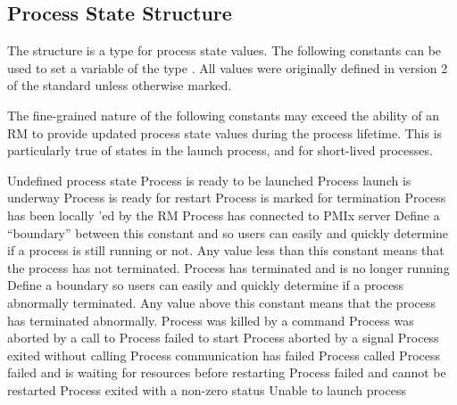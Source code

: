 \subsection{Process State Structure}
\label{api:struct:processstate}

The  structure is a  type for process state values. The following constants can be used to set a variable of the type . All values were originally defined in version 2 of the standard unless otherwise marked.

\adviceuserstart
The fine-grained nature of the following constants may exceed the ability of an \ac{RM} to provide updated process state values during the process lifetime. This is particularly true of states in the launch process, and for short-lived processes.
\adviceuserend

\begin{constantdesc}
%
Undefined process state
%
Process is ready to be launched
%
Process launch is underway
%
Process is ready for restart
%
Process is marked for termination
%
Process has been locally 'ed by the \ac{RM}
%
Process has connected to PMIx server
%
Define a ``boundary'' between this constant and  so users can easily and quickly determine if a process is still running or not.
Any value less than this constant means that the process has not terminated.
%
Process has terminated and is no longer running
%
Define a boundary so users can easily and quickly determine if a process abnormally terminated.
Any value above this constant means that the process has terminated abnormally.
%
Process was killed by a command
%
Process was aborted by a call to 
%
Process failed to start
%
Process aborted by a signal
%
Process exited without calling 
%
Process communication has failed
%
Process called 
%
Process failed and is waiting for resources before restarting
%
Process failed and cannot be restarted
%
Process exited with a non-zero status
%
Unable to launch process
%
\end{constantdesc}


